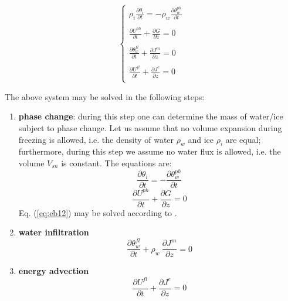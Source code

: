\begin{equation} \label{}
\left\{
\begin{array}{ll|}
\rho_i \frac{\partial \theta_i}{\partial t} =- \rho_w \frac{\partial \theta_w^{ph}}{\partial t}\\
\\
\frac{\partial U^{ph}}{\partial t} + \frac{\partial G}{\partial z} =0\\
\\
\frac{\partial \theta_w^{fl}}{\partial t}+ \frac{\partial J^m}{\partial z}=0\\
\\
\frac{\partial U^{fl}}{\partial t} +\frac{\partial J^e}{\partial z}=0\\
\end{array} \right. \,
\end{equation}

\noindent The above system may be solved in the following steps:
\begin{enumerate}
\item {\bf phase change}: during this step one can determine the mass of water/ice subject to phase change. Let us assume that no volume expansion during freezing is allowed, i.e. the density of water $\rho_w$ and ice $\rho_i$ are equal; furthermore, during this step we assume no water flux is allowed, i.e. the volume $V_{sn}$ is constant. The equations are:
\begin{equation}\label{eq:bbb1}
\frac{\partial \theta_i}{\partial t} =- \frac{\partial \theta_w^{ph}}{\partial t}
\end{equation}
\begin{equation}\label{eq:eb12}
\frac{\partial U^{ph}}{\partial t} + \frac{\partial G}{\partial z} =0
\end{equation}
%
Eq. (\ref{eq:eb12}) may be solved according to \citet{dall2010energy}.

\item {\bf water infiltration}
\begin{equation}\label{}
\frac{\partial \theta_w^{fl}}{\partial t} + \rho_w \ \frac{\partial J^m}{\partial z} =0
\end{equation}

\item {\bf energy advection}
\begin{equation}\label{}
\frac{\partial U^{fl}}{\partial t} + \frac{\partial J^e}{\partial z}=0
\end{equation}

\end{enumerate}


